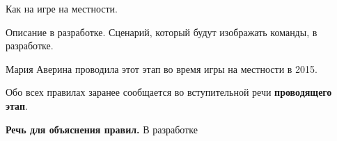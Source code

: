 
\par Как на игре на местности.

\par Описание в разработке. Сценарий, который будут изображать команды, в разработке.

\par Мария Аверина проводила этот этап во время игры на местности в 2015.

\par Обо всех правилах заранее сообщается во вступительной речи \textbf{проводящего этап}.

\par \textbf{Речь для объяснения правил.} В разработке